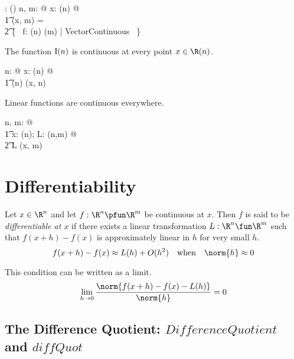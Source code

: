 \documentclass{amsart}
\begin{document}
\begin{axdef}
	\CzeroPointRtupRtup: \Rinf \cross \nat \fun \power (\Rinf \pfun \Rinf)
\where
	\forall n, m: \nat @ \forall x: \Rtup(n)  @ \\
	\t1	\CzeroPointRtupRtup(x, m) = \\
	\t2		\{~ f: \Rtup(n) \pfun \Rtup(m) | VectorContinuous ~\}
\end{axdef}

\begin{example}
The function $\operatorname{I}(n)$ is continuous at every point $x \in \Rtup(n)$.

\begin{zed}
	\forall n: \nat @ \forall x: \Rtup(n) @ \\
	\t1	\idRtup(n) \in \CzeroPointRtupRtup(x, n)
\end{zed}

\end{example}

\begin{theorem}
Linear functions are continuous everywhere.

\begin{zed}
	\forall n, m: \nat @ \\
	\t1	\forall x: \Rtup(n); L: \linRtup(n,m) @ \\
	\t2		L \in \CzeroPointRtupRtup(x, m)
\end{zed}

\end{theorem}


\section{Differentiability}

Let $x \in \R^n$ and let $f: \R^n \pfun \R^m$ be continuous at $x$.
Then $f$ is said to be {\it differentiable at $x$} if there exists a linear transformation $L: \R^n \fun \R^m$
such that $f(x + h) - f(x)$ is approximately linear in $h$ for very small $h$.
$$
f(x + h) - f(x) \approx  L(h) + O(h^2) \quad \text{when} \quad \norm{h} \approx 0
$$

This condition can be written as a limit.
$$
\lim_{h \to 0} \frac{\norm{f(x+h) - f(x) - L(h)}}{\norm{h}} = 0
$$

\subsection{The Difference Quotient: $DifferenceQuotient$ and $diffQuot$}
\end{document}
